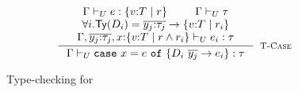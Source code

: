 \begin{figure}[t!]
$$\inference{
	\undechastype{\Gamma}{e}{\tref{v}{T}{}{r}} &&
	 \undeciswellformed{\Gamma}{\tau}\\
     \forall i. \constty{D_i} = \overline{y_j \colon \tau_j} \rightarrow \tref{v}{T}{}{r_i} \\
      \undechastype{\Gamma, \overline{y_j\colon \tau_j}, x \colon \tref{v}{T}{}{r \land r_i}}{e_i}{\tau}  \\
}{
	\undechastype{\Gamma}{\ecase{e}{D_i}{\overline{y_j}}{e_i}{x}}{\tau}
}[\rtcase]$$
\caption{Type-checking for \undeclang}
\label{fig:typing}
\end{figure}

